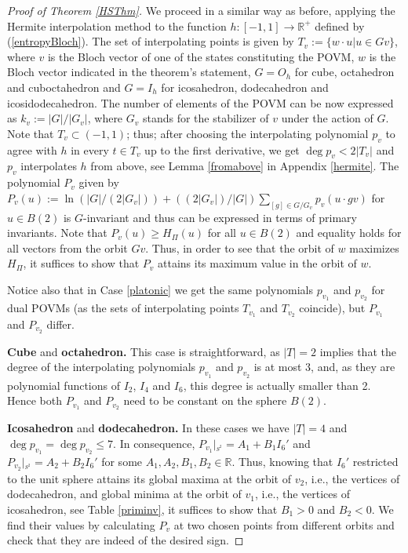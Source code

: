 \documentclass[11pt]{article}
\theoremstyle{remark}
\theoremstyle{definition}
\begin{document}
\begin{proof}[Proof of Theorem \ref{HSThm}]
	We proceed in a similar way as before, applying the Hermite interpolation method to the function $h:[-1,1]\to\mathbb R^+$ defined by (\ref{entropyBloch}). The set of interpolating points is given by $T_v:=\{w\cdot u|u\in Gv\}$, where $v$ is the Bloch vector of one of the states constituting the POVM, $w$ is the Bloch vector indicated in the theorem's statement, $G=O_h$ for cube, octahedron and cuboctahedron and $G=I_h$ for icosahedron, dodecahedron and icosidodecahedron. The number of elements of the POVM can be now expressed as $k_v:=|G|/|G_v|$, where $G_v$ stands for the stabilizer of $v$ under the action of $G$. Note that $T_v\subset(-1,1)$; thus; after choosing the interpolating polynomial $p_v$ to agree with $h$ in every $t\in T_v$ up to the first derivative, we get  $\deg p_v<2|T_v|$ and $p_v$ interpolates $h$ from above, see Lemma \ref{fromabove} in Appendix \ref{hermite}. 
	The polynomial $P_v$ given by $P_v(u):=\ln(|G|/(2 |G_v|))+((2 |G_v|)/|G|)\sum_{[g]\in G/G_v}p_v(u\cdot gv)$ for $u\in B(2)$ is $G$-invariant and thus can be expressed in terms of primary invariants. Note that $P_v(u)\geq H_{\Pi}(u)$ for all $u\in B(2)$ and equality holds for all vectors from the orbit $Gv$. Thus, in order to see that the orbit of $w$ maximizes $H_{\Pi}$, it suffices to show that $P_v$ attains its maximum value in the orbit of $w$.
	
	Notice also that in Case \ref{platonic} we get the same polynomials $p_{v_1}$ and $p_{v_2}$  for dual POVMs (as the sets of interpolating points $T_{v_1}$ and $T_{v_2}$ coincide), but $P_{v_1}$ and $P_{v_2}$ differ.
	
	
	{\bf Cube} and {\bf octahedron.} This case is straightforward, as $|T|=2$ implies that the degree of the interpolating polynomials $p_{v_1}$ and $p_{v_2}$ is at most 3, and, as they are polynomial functions of $I_2$, $I_4$ and $I_6$, this degree is actually smaller than 2. Hence both $P_{v_1}$ and $P_{v_2}$ need to be constant on the sphere $B(2)$.
	
	{\bf Icosahedron} and {\bf dodecahedron.} In these cases we have $|T|=4$ and $\deg p_{v_1}=\deg p_{v_2}\leq 7$. In consequence, $P_{v_1}|_{^{S^{2}}}=A_1  +B_1I_6'$ and $P_{v_2}|_{^{S^{2}}}=A_2 +B_2 I_6'$ for some $A_1, A_2,B_1,B_2\in\mathbb R$. Thus, knowing that $I_6'$ restricted to the unit sphere attains its global maxima at the orbit of $v_2$, i.e., the vertices of dodecahedron, and global minima at the orbit of $v_1$, i.e., the vertices of icosahedron, see Table \ref{priminv},  it suffices to show that $B_1>0$ and $B_2<0$. We find their values  by calculating $P_v$ at two chosen points from different orbits and check that they are indeed of the desired sign.
	

\end{proof}
\end{document}
